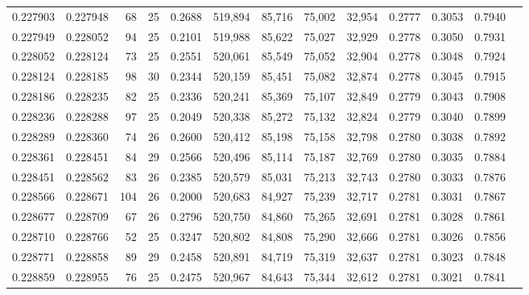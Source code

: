 \begin{tabular}{rrrrrrrrrrrrr}
0.227903 & 0.227948 &  68 &  25 &                                     0.2688 & 519,894 &  85,716 &  75,002 &  32,954 & 0.2777 & 0.3053 & 0.7940 \\
0.227949 & 0.228052 &  94 &  25 &                                     0.2101 & 519,988 &  85,622 &  75,027 &  32,929 & 0.2778 & 0.3050 & 0.7931 \\
0.228052 & 0.228124 &  73 &  25 &                                     0.2551 & 520,061 &  85,549 &  75,052 &  32,904 & 0.2778 & 0.3048 & 0.7924 \\
0.228124 & 0.228185 &  98 &  30 &                                     0.2344 & 520,159 &  85,451 &  75,082 &  32,874 & 0.2778 & 0.3045 & 0.7915 \\
0.228186 & 0.228235 &  82 &  25 &                                     0.2336 & 520,241 &  85,369 &  75,107 &  32,849 & 0.2779 & 0.3043 & 0.7908 \\
0.228236 & 0.228288 &  97 &  25 &                                     0.2049 & 520,338 &  85,272 &  75,132 &  32,824 & 0.2779 & 0.3040 & 0.7899 \\
0.228289 & 0.228360 &  74 &  26 &                                     0.2600 & 520,412 &  85,198 &  75,158 &  32,798 & 0.2780 & 0.3038 & 0.7892 \\
0.228361 & 0.228451 &  84 &  29 &                                     0.2566 & 520,496 &  85,114 &  75,187 &  32,769 & 0.2780 & 0.3035 & 0.7884 \\
0.228451 & 0.228562 &  83 &  26 &                                     0.2385 & 520,579 &  85,031 &  75,213 &  32,743 & 0.2780 & 0.3033 & 0.7876 \\
0.228566 & 0.228671 & 104 &  26 &                                     0.2000 & 520,683 &  84,927 &  75,239 &  32,717 & 0.2781 & 0.3031 & 0.7867 \\
0.228677 & 0.228709 &  67 &  26 &                                     0.2796 & 520,750 &  84,860 &  75,265 &  32,691 & 0.2781 & 0.3028 & 0.7861 \\
0.228710 & 0.228766 &  52 &  25 &                                     0.3247 & 520,802 &  84,808 &  75,290 &  32,666 & 0.2781 & 0.3026 & 0.7856 \\
0.228771 & 0.228858 &  89 &  29 &                                     0.2458 & 520,891 &  84,719 &  75,319 &  32,637 & 0.2781 & 0.3023 & 0.7848 \\
0.228859 & 0.228955 &  76 &  25 &                                     0.2475 & 520,967 &  84,643 &  75,344 &  32,612 & 0.2781 & 0.3021 & 0.7841 \\

\end{tabular}
